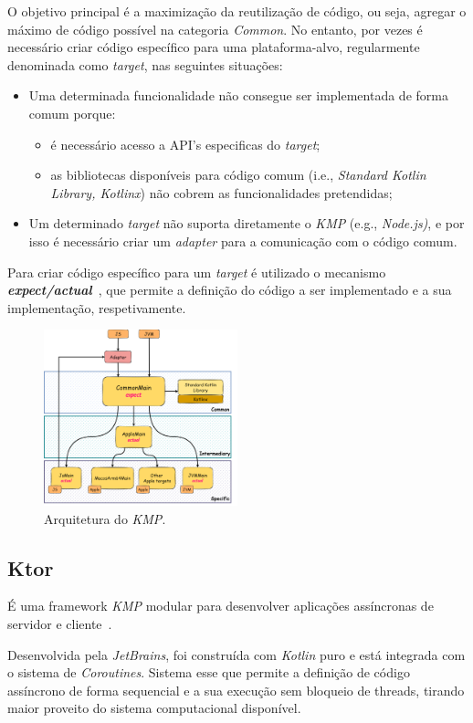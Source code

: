 O objetivo principal é a maximização da reutilização de código, ou seja, agregar o máximo de código possível na categoria \textit{Common}.
No entanto, por vezes é necessário criar código específico para uma plataforma-alvo, regularmente denominada como \textit{target}, nas seguintes situações:

\begin{itemize}[topsep=0pt,itemsep=0pt,partopsep=0pt, parsep=0pt]
    \item Uma determinada funcionalidade não consegue ser implementada de forma comum porque:
    \begin{itemize}[topsep=0pt,itemsep=0pt,partopsep=0pt, parsep=0pt]
        \item é necessário acesso a API's especificas do \textit{target};
        \item as bibliotecas disponíveis para código comum (i.e., \textit{Standard Kotlin Library, Kotlinx}) não cobrem as funcionalidades pretendidas;
    \end{itemize}
    \item Um determinado \textit{target} não suporta diretamente o \textit{KMP} (e.g., \textit{Node.js)}, e por isso é necessário criar um \textit{adapter} para a comunicação com o código comum.
\end{itemize}

Para criar código específico para um \textit{target} é utilizado o
mecanismo \textbf{\textit{expect/actual}}~\cite{kmp-expect-actual}, que permite a definição do código a ser implementado e a sua implementação, respetivamente.

\begin{figure}[H]
    \centering
    \includegraphics[width=0.5\textwidth]{../docs/imgs/kmp-architecture}
    \caption{Arquitetura do \textit{KMP}.}
    \label{fig:kmp-architecture}
\end{figure}

\subsection{Ktor}\label{subsec:ktor}

É uma framework \textit{KMP} modular para desenvolver aplicações assíncronas de
servidor e cliente~\cite{ktor}.

Desenvolvida pela \textit{JetBrains}, foi construída com \textit{Kotlin} puro e está integrada com o sistema de \textit{Coroutines}. Sistema esse que permite a definição de
código assíncrono de forma sequencial e a sua execução sem bloqueio de threads, tirando maior proveito do sistema computacional disponível.
